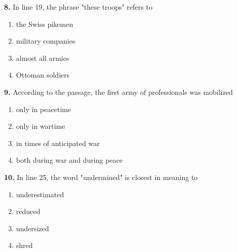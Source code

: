 \documentclass[12pt]{article}
\begin{document}
\vspace{0.25\baselineskip}
\noindent\textbf{8.} In line 19, the phrase "these troops" refers to
\begin{enumerate}[label=(\Alph*),leftmargin=*,itemsep=0.2em]
\item the Swiss pikemen
\item military companies
\item almost all armies
\item Ottoman soldiers
\end{enumerate}
\par
\vspace{0.25\baselineskip}
\noindent\textbf{9.} According to the passage, the first army of professionals was mobilized
\begin{enumerate}[label=(\Alph*),leftmargin=*,itemsep=0.2em]
\item only in peacetime
\item only in wartime
\item in times of anticipated war
\item both during war and during peace
\end{enumerate}
\par
\vspace{0.25\baselineskip}
\noindent\textbf{10.} In line 25, the word "undermined" is closest in meaning to
\begin{enumerate}[label=(\Alph*),leftmargin=*,itemsep=0.2em]
\item underestimated
\item reduced
\item undersized
\item shred
\end{enumerate}
\par
\vspace{0.25\baselineskip}
\end{document}
